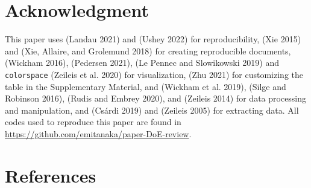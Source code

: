 \hypertarget{pkgs}{%
\section{Acknowledgment}\label{pkgs}}

This paper uses  (Landau 2021) and  (Ushey 2022) for reproducibility,  (Xie 2015) and  (Xie, Allaire, and Grolemund 2018) for creating reproducible documents,  (Wickham 2016),  (Pedersen 2021),  (Le Pennec and Slowikowski 2019) and \texttt{colorspace} (Zeileis et al. 2020) for visualization,  (Zhu 2021) for customizing the table in the Supplementary Material, and  (Wickham et al. 2019),  (Silge and Robinson 2016),  (Rudis and Embrey 2020), and  (Zeileis 2014) for data processing and manipulation, and  (Csárdi 2019) and  (Zeileis 2005) for extracting data. All codes used to reproduce this paper are found in \url{https://github.com/emitanaka/paper-DoE-review}.

\hypertarget{references}{%
\section*{References}\label{references}}

